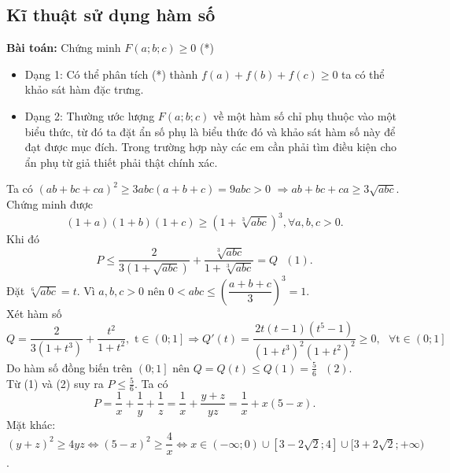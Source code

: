 \subsection{Kĩ thuật sử dụng hàm số}
\textbf{Bài toán:} Chứng minh $F\left( a;b;c \right)\ge 0$ (*)
\begin{itemize}
\item Dạng 1: Có thể phân tích (*) thành $f\left( a \right)+f\left( b \right)+f\left( c \right)\ge 0$ ta có thể khảo sát hàm đặc trưng.
\item Dạng 2: Thường ước lượng $F\left( a;b;c \right)$ về một hàm số chỉ phụ thuộc vào một biểu thức, từ đó ta đặt ẩn số phụ là biểu thức đó và khảo sát hàm số này để đạt được mục đích. Trong trường hợp này các em cần phải tìm điều kiện cho ẩn phụ từ giả thiết phải thật chính xác.
\end{itemize}
\hda  Ta có ${{\left( ab+bc+ca \right)}^{2}}\ge 3abc\left( a+b+c \right)=9abc>0$ $\Rightarrow ab+bc+ca\ge 3\sqrt{abc}$.
\\
Chứng minh được \[\left( 1+a \right)\left( 1+b \right)\left( 1+c \right)\ge {{\left( 1+\sqrt[3]{abc} \right)}^{3}},\forall a,b,c>0.\]
Khi đó \[P\le \frac{2}{3\left( 1+\sqrt{abc} \right)}+\frac{\sqrt[3]{abc}}{1+\sqrt[3]{abc}}=Q\text{ }\left( 1 \right).\]
Đặt $\sqrt[6]{abc}=t$. Vì $a,b,c>0$ nên $0<abc\le {{\left( \dfrac{a+b+c}{3} \right)}^{3}}=1$.\\
Xét hàm số \[Q=\frac{2}{3\left( 1+{{t}^{3}} \right)}+\frac{{{t}^{2}}}{1+{{t}^{2}}},\text{   t}\in \left( 0;1 \right]\Rightarrow Q'\left( t \right)=\frac{2t\left( t-1 \right)\left( {{t}^{5}}-1 \right)}{{{\left( 1+{{t}^{3}} \right)}^{2}}{{\left( 1+{{t}^{2}} \right)}^{2}}}\ge 0,\text{   }\forall \text{t}\in \left( 0;1 \right]\]
Do hàm số đồng biến trên $\left( 0;1 \right]$ nên $Q=Q\left( t \right)\le Q\left( 1 \right)=\frac{5}{6}\text{   }\left( 2 \right)$.\\ Từ (1) và (2) suy ra $P\le \frac{5}{6}$.
\hda  Ta có \[P=\frac{1}{x}+\frac{1}{y}+\frac{1}{z}=\frac{1}{x}+\frac{y+z}{yz}=\frac{1}{x}+x\left( 5-x \right).\]
Mặt khác: ${{\left( y+z \right)}^{2}}\ge 4yz\Leftrightarrow {{\left( 5-x \right)}^{2}}\ge \dfrac{4}{x}\Leftrightarrow x\in(-\infty;0)\cup[3-2\sqrt{2};4]\cup[3+2\sqrt{2};+\infty)$.\\
